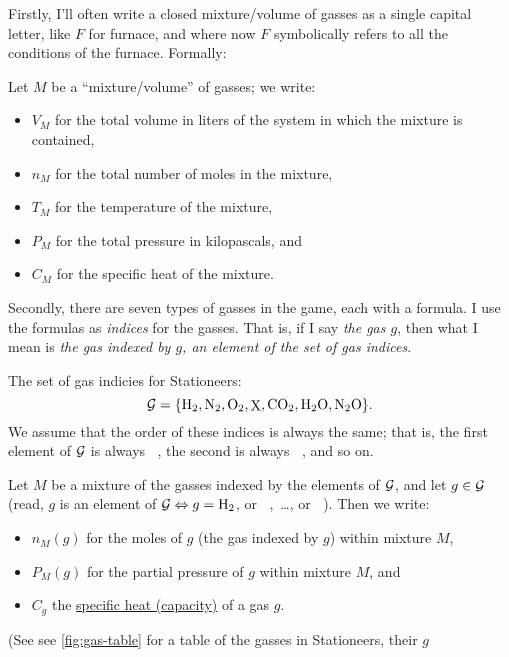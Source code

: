 \documentclass{article}
\DeclareMathOperator{\Hyd}{\mathrm{H}_2}
\DeclareMathOperator{\Nit}{\mathrm{N}_2}
\DeclareMathOperator{\Ox}{\mathrm{O}_2}
\DeclareMathOperator{\Pol}{\mathrm{X}}
\DeclareMathOperator{\CDiox}{\mathrm{CO}_2}
\DeclareMathOperator{\Water}{\mathrm{H}_2\mathrm{O}}
\DeclareMathOperator{\NiOx}{\mathrm{N}_2\mathrm{O}}
\begin{document}
Firstly, I'll often write a closed mixture/volume of gasses as a single capital letter, like $F$ for
furnace, and where now $F$ symbolically refers to all the conditions of the furnace. Formally:
\begin{definition}
    Let $M$ be a ``mixture/volume'' of gasses; we write:
    \begin{itemize}
        \item $V_M$ for the total volume in liters of the system in which the mixture is contained,
        \item $n_M$ for the total number of moles in the mixture,
        \item $T_M$ for the temperature of the mixture,
        \item $P_M$ for the total pressure in kilopascals, and
        \item $C_M$ for the specific heat of the mixture.
    \end{itemize}
\end{definition}
Secondly, there are seven types of gasses in the game, each with a formula. I use the formulas as
\emph{indices} for the gasses. That is, if I say \emph{the gas $g$}, then what I mean is \emph{the
gas indexed by $g$, an element of the set of gas indices}.
\begin{definition}
    The set of gas indicies for Stationeers:
    \[
        \calG = \{\Hyd,\Nit,\Ox,\Pol,\CDiox,\Water,\NiOx\}.
    \]
    We assume that the order of these indices is always the same;
    that is, the first element of $\operatorname{{\mathcal{G}}}$ is always $\Hyd$, the second is always $\Nit$, and so on.

    Let $M$ be a mixture of the gasses indexed by the elements of $\operatorname{{\mathcal{G}}}$, and
    let $g\in\operatorname{{\mathcal{G}}}$ (read, $g$ is an element of $\calG\Leftrightarrow g=\Hyd$, or $\Nit$,\ \ldots, or $\NiOx$).
    Then we write:
    \begin{itemize}
        \item $n_M(g)$ for the moles of $g$ (the gas indexed by $g$) within mixture $M$,
        \item $P_M(g)$ for the partial pressure of $g$ within mixture $M$, and
        \item $C_g$ the \href{https://en.wikipedia.org/wiki/Specific_heat_capacity}{specific heat
            (capacity)} of a gas $g$.
    \end{itemize}
\end{definition}
(See see \autoref{fig:gas-table} for a table of the gasses in Stationeers, their $g$
\end{document}
